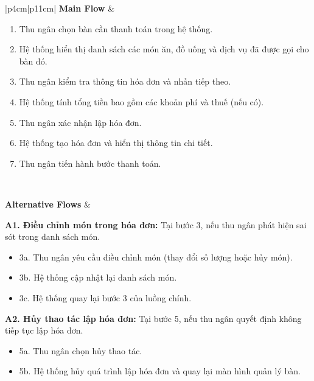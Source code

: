 \begin{longtable}{|p{4cm}|p{11cm}|}
\textbf{Main Flow} &
\begin{minipage}[t]{\linewidth}
\vspace{0.3mm}
\begin{enumerate}
\item Thu ngân chọn bàn cần thanh toán trong hệ thống.
\item Hệ thống hiển thị danh sách các món ăn, đồ uống và dịch vụ đã được gọi cho bàn đó.
\item Thu ngân kiểm tra thông tin hóa đơn và nhấn tiếp theo.
\item Hệ thống tính tổng tiền bao gồm các khoản phí và thuế (nếu có).
\item Thu ngân xác nhận lập hóa đơn.
\item Hệ thống tạo hóa đơn và hiển thị thông tin chi tiết.
\item Thu ngân tiến hành bước thanh toán.
\end{enumerate}
\vspace{0.3mm}
\end{minipage}
\\ \hline

\textbf{Alternative Flows} &
\begin{minipage}[t]{\linewidth}
\vspace{0.3mm}

\textbf{A1. Điều chỉnh món trong hóa đơn:} Tại bước 3, nếu thu ngân phát hiện sai sót trong danh sách món.

\begin{itemize}
\item 3a. Thu ngân yêu cầu điều chỉnh món (thay đổi số lượng hoặc hủy món).
\item 3b. Hệ thống cập nhật lại danh sách món.
\item 3c. Hệ thống quay lại bước 3 của luồng chính.
\end{itemize}

\textbf{A2. Hủy thao tác lập hóa đơn:} Tại bước 5, nếu thu ngân quyết định không tiếp tục lập hóa đơn.

\begin{itemize}
\item 5a. Thu ngân chọn hủy thao tác.
\item 5b. Hệ thống hủy quá trình lập hóa đơn và quay lại màn hình quản lý bàn.
\end{itemize}

\vspace{0.3mm}
\end{minipage}
\\ \hline


\end{longtable}
